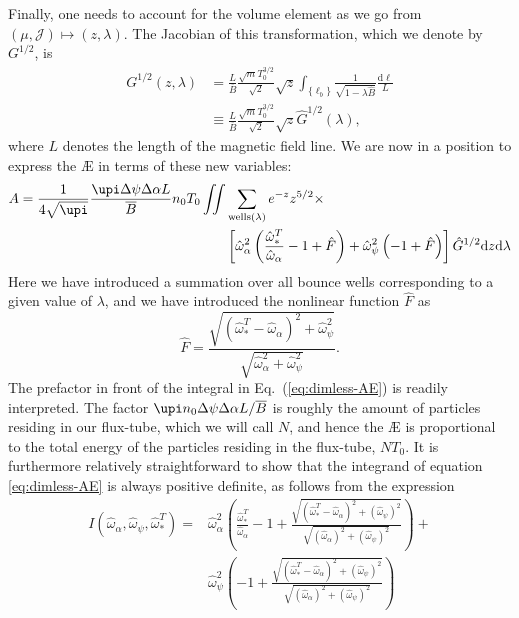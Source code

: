 Finally, one needs to account for the volume element as we go from $(\mu,\mathcal{J}) \mapsto (z,\lambda)$. The Jacobian of this transformation, which we  denote by $G^{1/2}$, is
\begin{equation}
    \begin{aligned}
         G^{1/2}(z,\lambda) &=  \frac{L}{\overline{B}} \frac{\sqrt{m} T_0^{3/2}}{\sqrt{2} } \sqrt{z} \int_{\{\ell_{b}\}} \frac{1}{\sqrt{1-\lambda\hat{B}}} \frac{ \mathrm{d}\ell}{L} \\ 
         &\equiv \frac{L}{\overline{B}} \frac{\sqrt{m }T_0^{3/2}}{\sqrt{2} } \sqrt{z} \hat{G}^{1/2}(\lambda),
    \end{aligned}
\end{equation}
where $L$ denotes the length of the magnetic field line. We are now in a position to express the \AE{} in terms of these new variables:
\begin{equation}
\begin{aligned}
    A = \frac{1}{4 \sqrt{\upi}} \frac{\upi \Delta \psi \Delta \alpha L}{\overline{B}} n_0 T_0 \iint & \sum_{\text{wells}(\lambda)} e^{-z} z^{5/2} \times \\ 
    & \left[ \hat{\omega}_\alpha^2 \left( \frac{\hat{\omega}_*^T}{\hat{\omega}_\alpha} - 1 +  \hat{F} \right) + \hat{\omega}_\psi^2 \left( -1 + \hat{F} \right)  \right] \hat{G}^{1/2} \mathrm{d}z \mathrm{d}\lambda
\end{aligned}
\label{eq:dimless-AE}
\end{equation}
Here we have introduced a summation over all bounce wells corresponding to a given value of $\lambda$, and we have introduced the nonlinear function $\hat{F}$ as
\begin{equation}
    \hat{F} = \frac{\sqrt{(\hat{\omega}_*^T - \hat{\omega}_\alpha)^2 + \hat{\omega}_\psi^2 }}{\sqrt{\hat{\omega}_\alpha^2 + \hat{\omega}_\psi^2 } }.
\end{equation}
The prefactor in front of the integral in Eq.~(\ref{eq:dimless-AE}) is readily interpreted. The factor $\upi n_0 \Delta \psi \Delta \alpha L / \overline{B}$ is roughly the amount of particles residing in our flux-tube, which we will call $N$, and hence the \AE{} is proportional to the total energy of the particles residing in the flux-tube, $NT_0$. It is furthermore relatively straightforward to show that the integrand of equation \eqref{eq:dimless-AE} is always positive definite, as follows from the expression
\begin{equation}
\begin{aligned}
    I(\hat{\omega}_\alpha, \hat{\omega}_\psi, \hat{\omega}_*^T) = & \hat{\omega}_\alpha^2 \left( \frac{\hat{\omega}_*^T}{\hat{\omega}_\alpha} - 1 +  \frac{\sqrt{(\hat{\omega}_*^T - \hat{\omega}_\alpha)^2 + 
     (\hat{\omega}_\psi)^2}}{\sqrt{(\hat{\omega}_\alpha)^2 + (\hat{\omega}_\psi)^2}} \right) + \\
     & \hat{\omega}_\psi^2 \left( -1 + \frac{\sqrt{(\hat{\omega}_*^T - \hat{\omega}_\alpha)^2 + (\hat{\omega}_\psi)^2}}{\sqrt{(\hat{\omega}_\alpha)^2 + (\hat{\omega}_\psi)^2}} \right)
\end{aligned}
\end{equation}
